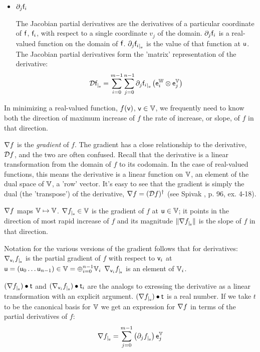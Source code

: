 \begin{itemize}
\item ${\partial}_{j}{\mathsf{f}_i}$

The Jacobian partial derivatives are the derivatives of
a particular coordinate of $\mathsf{f}$, $\mathsf{f}_i$, with respect to
a single coordinate $v_j$ of the domain.
${\partial}_{j}{\mathsf{f}_i}$ is a real-valued function on the domain of $\mathsf{f}$.
${\partial}_{j}{\mathsf{f}_i}_{\mid_{\mathsf{u}}}$ is the value of that function at $\mathsf{u}$.
The Jacobian partial derivatives form the 'matrix' representation of the derivative:
\begin{equation}
{\mathcal{D}{\mathsf{f}}_{\mid_{\mathsf{u}}}} =
\sum_{i=0}^{m-1}
\sum_{j=0}^{n-1}
{\partial}_{j}{\mathsf{f}_i}_{\mid_{\mathsf{u}}} \left( \mathsf{e}_i^{\mathbb{W}} \otimes \mathsf{e}_j^{\mathbb{V}} \right)
\end{equation}

\end{itemize}

In minimizing a real-valued function, $f(\mathsf{v})$, $\mathsf{v} \in \mathbb{V}$,
we frequently need to know both the direction of maximum increase of $f$
the rate of increase, or slope, of $f$ in that direction.

${\mathbf \nabla}{f}$ is the \textit{gradient} of $f$.
The gradient has a close relationship to the derivative, ${\mathcal{D}{f}}$,
and the two are often confused.
Recall that the derivative is a linear transformation
from the domain of $f$ to its codomain.
In the case of real-valued functions,
this means the derivative is a linear function on $\mathbb{V}$,
an element of the dual space of $\mathbb{V}$, a 'row' vector.
It's easy to see that the gradient is simply the dual (the 'transpose')
of the derivative, ${\mathbf \nabla}{f} = ({\mathcal{D}{f}})^{\dagger}$
(see Spivak \cite{spivak-1965}, p. 96, ex. 4-18).

${\mathbf \nabla}{f}$ maps $\mathbb{V} \mapsto \mathbb{V}$.
${\mathbf \nabla}{f}_{\mid_{\mathsf{u}}} \in \mathbb{V}$ is the gradient of $f$ at $\mathsf{u} \in \mathbb{V}$;
it points in the direction of most rapid increase of
$f$ and its magnitude $\| {\mathbf \nabla}{f}_{\mid_{\mathsf{u}}} \|$ is the
slope of $f$ in that direction.

Notation for the various versions of the gradient
follows that for derivatives:
${\mathbf \nabla}_{\mathsf{v}_i}{{f}}_{\mid_{\mathsf{u}}}$ is the partial gradient of $f$ with respect to $\mathsf{v}_i$ at
$\mathsf{u} = \left( \mathsf{u}_0 \ldots \mathsf{u}_{n-1} \right) \in \mathbb{V} = \oplus_{i=0}^{n-1} \mathbb{V}_i$
${\mathbf \nabla}_{\mathsf{v}_i}{{f}}_{\mid_{\mathsf{u}}}$ is an element of $\mathbb{V}_i$.

$({\mathbf \nabla}{f}_{\mid_{\mathsf{u}}}) \bullet  \mathsf{t}$
and
$({\mathbf \nabla}_{\mathsf{v}_i}{{f}}_{\mid_{\mathsf{u}}}) \bullet \mathsf{t}_i$
are the analogs to exressing the derivative as a linear transformation
with an explicit argument.
$({\mathbf \nabla}{f}_{\mid_{\mathsf{u}}}) \bullet  \mathsf{t}$ is a real number.
If we take $t$ to be the canonical basis for $\mathbb{V}$
we get an expression for ${\mathbf \nabla}{f}$ in terms of the partial derivatives of $f$:
\begin{equation}
\label{eq:gradient-from-partials}
{\mathbf \nabla}{f}_{\mid_{\mathsf{u}}} = \sum_{j=0}^{m-1} \left( {\partial}_{j}{f}_{\mid_{\mathsf{u}}} \right) \mathsf{e}_j^{\mathbb{V}}
\end{equation}

